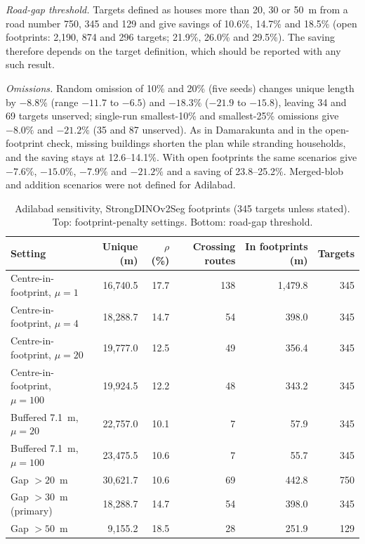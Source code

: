 \documentclass[12pt,a4paper]{article}
\newcommand{\dinoseg}{StrongDINOv2Seg}
\begin{document}
\emph{Road-gap threshold.} Targets defined as houses more than 20, 30 or 50~m from a road number 750, 345 and 129 and give savings of 10.6\%, 14.7\% and 18.5\% (open footprints: 2{,}190, 874 and 296 targets; 21.9\%, 26.0\% and 29.5\%). The saving therefore depends on the target definition, which should be reported with any such result.

\emph{Omissions.} Random omission of 10\% and 20\% (five seeds) changes unique length by $-8.8\%$ (range $-11.7$ to $-6.5$) and $-18.3\%$ ($-21.9$ to $-15.8$), leaving 34 and 69 targets unserved; single-run smallest-10\% and smallest-25\% omissions give $-8.0\%$ and $-21.2\%$ (35 and 87 unserved). As in Damarakunta and in the open-footprint check, missing buildings shorten the plan while stranding households, and the saving stays at 12.6--14.1\%. With open footprints the same scenarios give $-7.6\%$, $-15.0\%$, $-7.9\%$ and $-21.2\%$ and a saving of 23.8--25.2\%. Merged-blob and addition scenarios were not defined for Adilabad.

\begin{table}[t]
\caption{Adilabad sensitivity, \dinoseg{} footprints (345 targets unless stated). Top: footprint-penalty settings. Bottom: road-gap threshold.}
\label{tab:sens}
\centering
\footnotesize
\begin{tabular}{@{}lrrrrr@{}}
\toprule
Setting & Unique (m) & $\rho$ (\%) & Crossing routes & In footprints (m) & Targets\\
\midrule
Centre-in-footprint, $\mu=1$ & 16{,}740.5 & 17.7 & 138 & 1{,}479.8 & 345\\
Centre-in-footprint, $\mu=4$ & 18{,}288.7 & 14.7 & 54 & 398.0 & 345\\
Centre-in-footprint, $\mu=20$ & 19{,}777.0 & 12.5 & 49 & 356.4 & 345\\
Centre-in-footprint, $\mu=100$ & 19{,}924.5 & 12.2 & 48 & 343.2 & 345\\
Buffered 7.1~m, $\mu=20$ & 22{,}757.0 & 10.1 & 7 & 57.9 & 345\\
Buffered 7.1~m, $\mu=100$ & 23{,}475.5 & 10.6 & 7 & 55.7 & 345\\
\midrule
Gap $>20$~m & 30{,}621.7 & 10.6 & 69 & 442.8 & 750\\
Gap $>30$~m (primary) & 18{,}288.7 & 14.7 & 54 & 398.0 & 345\\
Gap $>50$~m & 9{,}155.2 & 18.5 & 28 & 251.9 & 129\\
\bottomrule
\end{tabular}
\end{table}
\end{document}
